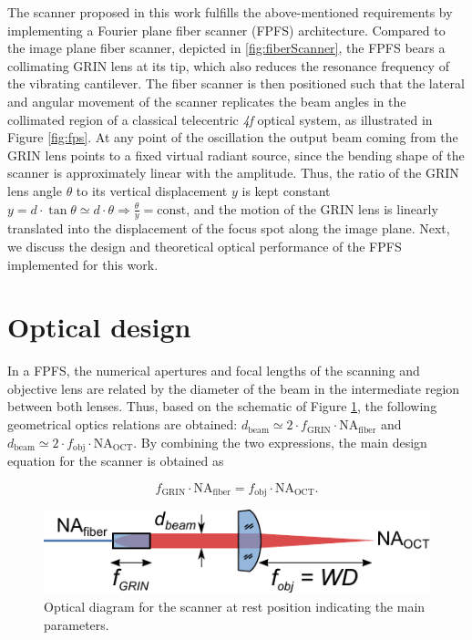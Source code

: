 \documentclass[10pt]{iopart}
\begin{document}
The scanner proposed in this work fulfills the above-mentioned requirements by implementing a Fourier plane fiber scanner (FPFS) architecture. Compared to the image plane fiber scanner, depicted in \autoref{fig:fiberScanner}, the FPFS bears a collimating GRIN lens at its tip, which also reduces the resonance frequency of the vibrating cantilever. The fiber scanner is then positioned such that the lateral and angular movement of the scanner replicates the beam angles in the collimated region of a classical telecentric \textit{4f} optical system, as illustrated in Figure \ref{fig:fps}. At any point of the oscillation the output beam coming from the GRIN lens points to a fixed virtual radiant source, since the bending shape of the scanner is approximately linear with the amplitude. Thus, the ratio of the GRIN lens angle $\theta$ to its vertical displacement $y$ is kept constant $ y = d \cdot \tan \theta \simeq d \cdot \theta \Rightarrow \frac{\theta}{y} = \mathrm{const} $, and the motion of the GRIN lens is linearly translated into the displacement of the focus spot along the image plane. Next, we discuss the design and theoretical  optical performance of the FPFS implemented for this work.


\section{Optical design}\label{sec:opt}
In a FPFS, the numerical apertures and focal lengths of the scanning and objective lens are related by the diameter of the beam in the intermediate region between both lenses. Thus, based on the schematic of Figure \ref{fig:opticsParam}, the following geometrical optics relations are obtained: $d_\mathrm{beam} \simeq 2\cdot f_\mathrm{GRIN}\cdot \mathrm{NA}_\mathrm{fiber}$ and $d_\mathrm{beam} \simeq 2 \cdot f_\mathrm{obj}\cdot \mathrm{NA}_\mathrm{OCT}$. By combining the two expressions, the main design equation for the scanner is obtained as

\begin{equation}
	f_\mathrm{GRIN} \cdot \mathrm{NA}_\mathrm{fiber} = f_\mathrm{obj} \cdot \mathrm{NA}_\mathrm{OCT}.
	\label{eq:fpsNA}
\end{equation} 

\begin{figure}[h]\centering
      \includegraphics{figures/opticsParam.pdf}
      \caption{Optical diagram for the scanner at rest position indicating the main parameters.}
      \label{fig:opticsParam}
\end{figure}
\end{document}
